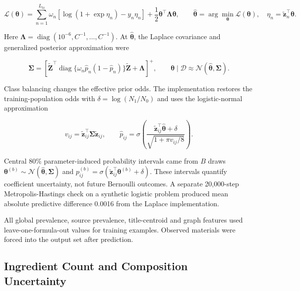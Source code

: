\documentclass[11pt]{article}
\begin{document}
\begin{equation}
\label{eq:map-objective}
\mathcal L(\boldsymbol\theta)=\sum_{n=1}^{L_{\mathrm{tr}}}\omega_n[\log(1+\exp\eta_n)-y_n\eta_n]+\frac{1}{2}\boldsymbol\theta^{\top}\boldsymbol\Lambda\boldsymbol\theta,\qquad \widehat{\boldsymbol\theta}=\arg\min_{\boldsymbol\theta}\mathcal L(\boldsymbol\theta),\quad \eta_n=\widetilde{\mathbf z}_n^{\top}\boldsymbol\theta.
\end{equation}

Here \(\boldsymbol\Lambda=\operatorname{diag}(10^{-6},C^{-1},\ldots,C^{-1})\). At \(\widehat{\boldsymbol\theta}\), the Laplace covariance and generalized posterior approximation were

\begin{equation}
\label{eq:laplace-posterior}
\boldsymbol\Sigma=\left[\widetilde{\mathbf Z}^{\top}\operatorname{diag}\{\omega_n\widehat p_n(1-\widehat p_n)\}\widetilde{\mathbf Z}+\boldsymbol\Lambda\right]^{+},\qquad \boldsymbol\theta\mid\mathcal D\approx\mathcal N(\widehat{\boldsymbol\theta},\boldsymbol\Sigma).
\end{equation}

Class balancing changes the effective prior odds. The implementation restores the training-population odds with \(\delta=\log(N_1/N_0)\) and uses the logistic-normal approximation

\begin{equation}
\label{eq:predictive-probability}
v_{ij}=\widetilde{\mathbf z}_{ij}^{\top}\boldsymbol\Sigma\widetilde{\mathbf z}_{ij},\qquad \widehat p_{ij}=\sigma\left(\frac{\widetilde{\mathbf z}_{ij}^{\top}\widehat{\boldsymbol\theta}+\delta}{\sqrt{1+\pi v_{ij}/8}}\right).
\end{equation}

Central 80\% parameter-induced probability intervals came from \(B\) draws \(\boldsymbol\theta^{(b)}\sim\mathcal N(\widehat{\boldsymbol\theta},\boldsymbol\Sigma)\) and \(p_{ij}^{(b)}=\sigma(\widetilde{\mathbf z}_{ij}^{\top}\boldsymbol\theta^{(b)}+\delta)\). These intervals quantify coefficient uncertainty, not future Bernoulli outcomes. A separate 20,000-step Metropolis-Hastings check on a synthetic logistic problem produced mean absolute predictive difference 0.0016 from the Laplace implementation.

All global prevalence, source prevalence, title-centroid and graph features used leave-one-formula-out values for training examples. Observed materials were forced into the output set after prediction.

\subsection{Ingredient Count and Composition Uncertainty}
\end{document}
